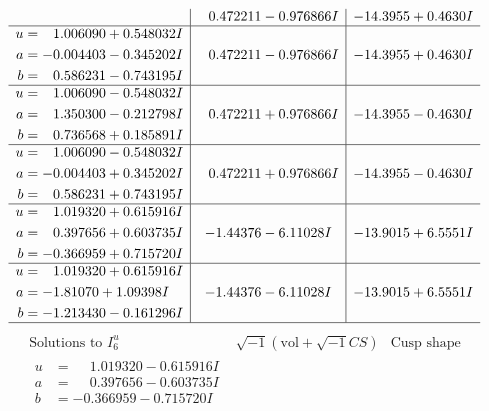 \documentclass[1p]{elsarticle_modified}
\theoremstyle{definition}
\newcommand{\I}{\sqrt{-1}}
\begin{document}
$$\begin{array}{c|c|c}
 & \phantom{-}0.472211 - 0.976866 I & -14.3955 + 0.4630 I \\ \hline\begin{aligned}
u &= \phantom{-}1.006090 + 0.548032 I \\
a &= -0.004403 - 0.345202 I \\
b &= \phantom{-}0.586231 - 0.743195 I\end{aligned}
 & \phantom{-}0.472211 - 0.976866 I & -14.3955 + 0.4630 I \\ \hline\begin{aligned}
u &= \phantom{-}1.006090 - 0.548032 I \\
a &= \phantom{-}1.350300 - 0.212798 I \\
b &= \phantom{-}0.736568 + 0.185891 I\end{aligned}
 & \phantom{-}0.472211 + 0.976866 I & -14.3955 - 0.4630 I \\ \hline\begin{aligned}
u &= \phantom{-}1.006090 - 0.548032 I \\
a &= -0.004403 + 0.345202 I \\
b &= \phantom{-}0.586231 + 0.743195 I\end{aligned}
 & \phantom{-}0.472211 + 0.976866 I & -14.3955 - 0.4630 I \\ \hline\begin{aligned}
u &= \phantom{-}1.019320 + 0.615916 I \\
a &= \phantom{-}0.397656 + 0.603735 I \\
b &= -0.366959 + 0.715720 I\end{aligned}
 & -1.44376 - 6.11028 I & -13.9015 + 6.5551 I \\ \hline\begin{aligned}
u &= \phantom{-}1.019320 + 0.615916 I \\
a &= -1.81070 + 1.09398 I \\
b &= -1.213430 - 0.161296 I\end{aligned}
 & -1.44376 - 6.11028 I & -13.9015 + 6.5551 I\\
 \hline 
 \end{array}$$\newpage$$\begin{array}{c|c|c}  
\text{Solutions to }I^u_{6}& \I (\text{vol} + \sqrt{-1}CS) & \text{Cusp shape}\\
 \hline 
\begin{aligned}
u &= \phantom{-}1.019320 - 0.615916 I \\
a &= \phantom{-}0.397656 - 0.603735 I \\
b &= -0.366959 - 0.715720 I\end{aligned}

\end{array}$$
\end{document}
